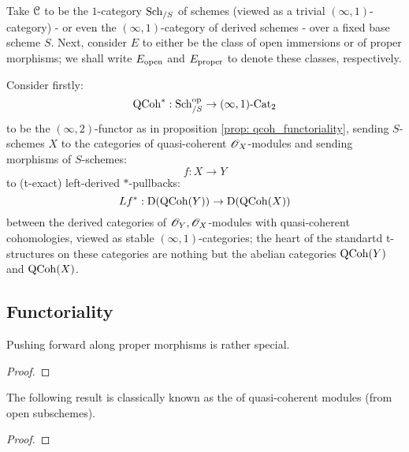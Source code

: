             \begin{example}
                Take $\mathcal{C}$ to be the $1$-category $\mathrm{Sch}_{/S}$ of schemes (viewed as a trivial $(\infty, 1)$-category) - or even the $(\infty, 1)$-category of derived schemes - over a fixed base scheme $S$. Next, consider $E$ to either be the class of open immersions or of proper morphisms; we shall write $E_{\mathrm{open}}$ and $E_{\mathrm{proper}}$ to denote these classes, respectively.

                Consider firstly:
                    $$\mathrm{QCoh}^*: \mathrm{Sch}_{/S}^{\mathrm{op}} \to (\infty, 1)\text{-}\mathrm{Cat}_2$$
                to be the $(\infty, 2)$-functor as in proposition \ref{prop: qcoh_functoriality}, sending $S$-schemes $X$ to the categories of quasi-coherent $\mathscr{O}_X$-modules and sending morphisms of $S$-schemes:
                    $$f: X \to Y$$
                to (t-exact) left-derived $*$-pullbacks:
                    $$Lf^*: \mathrm{D}(\mathrm{QCoh}(Y)) \to \mathrm{D}(\mathrm{QCoh}(X))$$
                between the derived categories of $\mathscr{O}_Y, \mathscr{O}_X$-modules with quasi-coherent cohomologies, viewed as stable $(\infty, 1)$-categories; the heart of the standartd t-structures on these categories are nothing but the abelian categories $\mathrm{QCoh}(Y)$ and $\mathrm{QCoh}(X)$. 
            \end{example}

        \subsection{Functoriality}
            Pushing forward along proper morphisms is rather special. 
            \begin{theorem} \label{theorem: proper_adjunction}
                
            \end{theorem}
                \begin{proof}
                    
                \end{proof}

            The following result is classically known as the  of quasi-coherent modules (from open subschemes). 
            \begin{theorem} \label{theorem: open_adjunction}
                
            \end{theorem}
                \begin{proof}
                    
                \end{proof}

